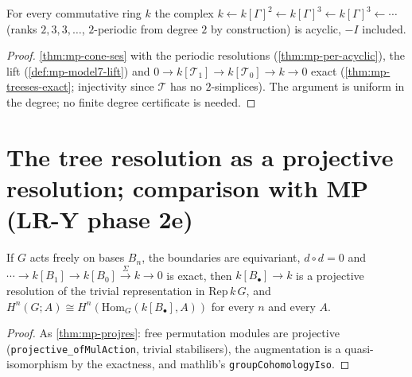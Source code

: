 \begin{theorem}\label{thm:mp-model7-cone-res}
  \leanok
  For every commutative ring $k$ the complex $k\leftarrow k[\Gamma]^2\leftarrow k[\Gamma]^3\leftarrow k[\Gamma]^3\leftarrow\cdots$
  (ranks $2,3,3,\dots$, $2$-periodic from degree $2$ by construction) is acyclic, $-I$ included.
\end{theorem}
\begin{proof}
  \leanok
  \ref{thm:mp-cone-ses} with the periodic resolutions (\ref{thm:mp-per-acyclic}), the lift (\ref{def:mp-model7-lift}) and
  $0\to k[\mathcal T_1]\to k[\mathcal T_0]\to k\to0$ exact (\ref{thm:mp-treeses-exact}; injectivity since $\mathcal T$ has no
  $2$-simplices).  The argument is uniform in the degree; no finite degree certificate is needed.
\end{proof}

\section{The tree resolution as a projective resolution; comparison with MP (LR-Y phase 2e)}

\begin{theorem}\label{thm:mp-perm-res}
  \leanok
  If $G$ acts freely on bases $B_n$, the boundaries are equivariant, $d\circ d=0$ and $\cdots\to k[B_1]\to k[B_0]\xrightarrow{\Sigma}k\to0$
  is exact, then $k[B_\bullet]\to k$ is a projective resolution of the trivial representation in $\mathrm{Rep}\,k\,G$, and
  $H^n(G;A)\cong H^n(\mathrm{Hom}_G(k[B_\bullet],A))$ for every $n$ and every $A$.
\end{theorem}
\begin{proof}
  \leanok
  As \ref{thm:mp-projres}: free permutation modules are projective (\texttt{projective\_ofMulAction}, trivial stabilisers), the
  augmentation is a quasi-isomorphism by the exactness, and mathlib's \texttt{groupCohomologyIso}.
\end{proof}

